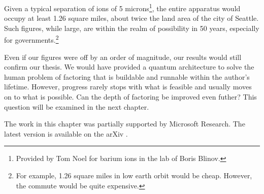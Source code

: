Given a typical
separation of ions of 5 microns\footnote{Provided
by Tom Noel for barium ions in the lab of Boris Blinov.},
the entire apparatus would occupy at least 1.26
square miles, about twice the land area of the city
of Seattle. Such figures, while large, are
within the realm of possibility in 50 years, especially
for governments.\footnote{For example,
1.26 square miles in low earth orbit would be cheap.
However, the commute would be quite expensive.}

Even if our figures were off by an order of magnitude,
our results would still confirm our thesis. We
would have provided a quantum architecture to solve
the human problem of factoring that is
buildable and runnable within the author's lifetime.
However, progress rarely stops with what is
feasible and usually moves on to what is possible.
Can the depth of factoring be improved even futher?
This question will be examined
in the next chapter.

The work in this chapter was partially supported by
Microsoft Research. The latest version is
available on the arXiv \cite{Pham2012}.